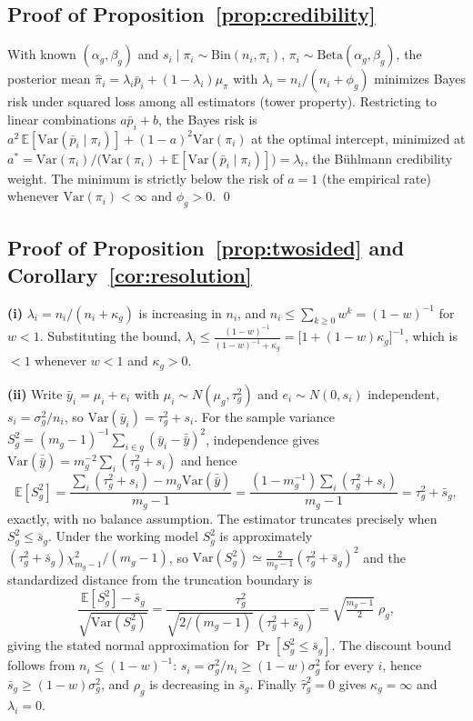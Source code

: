 \documentclass[twocolumn,10pt]{article}
\theoremstyle{definition}
\newcommand{\E}{\mathbb{E}}
\newcommand{\Var}{\mathrm{Var}}
\begin{document}
\subsection{Proof of Proposition~\ref{prop:credibility}}
With known $(\alpha_g,\beta_g)$ and $s_i\mid\pi_i\sim
\mathrm{Bin}(n_i,\pi_i)$, $\pi_i\sim\mathrm{Beta}(\alpha_g,\beta_g)$,
the posterior mean $\hat\pi_i=\lambda_i\bar p_i+(1-\lambda_i)\mu_\pi$
with $\lambda_i=n_i/(n_i+\phi_g)$ minimizes Bayes risk under squared
loss among all estimators (tower property). Restricting to linear
combinations $a\bar p_i+b$, the Bayes risk is
$a^2\,\E[\Var(\bar p_i\mid\pi_i)] + (1-a)^2\Var(\pi_i)$ at the optimal
intercept, minimized at
$a^{*}=\Var(\pi_i)/\bigl(\Var(\pi_i)+\E[\Var(\bar p_i\mid\pi_i)]\bigr)
=\lambda_i$, the B\"uhlmann credibility weight. The minimum is strictly
below the risk of $a=1$ (the empirical rate) whenever
$\Var(\pi_i)<\infty$ and $\phi_g>0$. \qed

\subsection{Proof of Proposition~\ref{prop:twosided} and
Corollary~\ref{cor:resolution}}

\textbf{(i)} $\lambda_i=n_i/(n_i+\kappa_g)$ is increasing in $n_i$, and
$n_i\le\sum_{k\ge0}w^{k}=(1-w)^{-1}$ for $w<1$. Substituting the bound,
$\lambda_i\le\frac{(1-w)^{-1}}{(1-w)^{-1}+\kappa_g}
=\bigl[1+(1-w)\kappa_g\bigr]^{-1}$, which is $<1$ whenever $w<1$ and
$\kappa_g>0$.

\textbf{(ii)} Write $\bar y_i=\mu_i+e_i$ with
$\mu_i\sim N(\mu_g,\tau_g^2)$ and $e_i\sim N(0,s_i)$ independent,
$s_i=\sigma_g^2/n_i$, so $\Var(\bar y_i)=\tau_g^2+s_i$. For the sample
variance $S_g^2=(m_g-1)^{-1}\sum_{i\in g}(\bar y_i-\bar{\bar y})^2$,
independence gives
$\Var(\bar{\bar y})=m_g^{-2}\sum_i(\tau_g^2+s_i)$ and hence
\[
\E[S_g^2]=\frac{\sum_i(\tau_g^2+s_i)-m_g\Var(\bar{\bar y})}{m_g-1}
=\frac{(1-m_g^{-1})\sum_i(\tau_g^2+s_i)}{m_g-1}
=\tau_g^2+\bar s_g ,
\]
exactly, with no balance assumption. The estimator truncates precisely
when $S_g^2\le\bar s_g$. Under the working model $S_g^2$ is
approximately $(\tau_g^2+\bar s_g)\chi^2_{m_g-1}/(m_g-1)$, so
$\Var(S_g^2)\simeq\frac{2}{m_g-1}(\tau_g^2+\bar s_g)^2$ and the
standardized distance from the truncation boundary is
\[
\frac{\E[S_g^2]-\bar s_g}{\sqrt{\Var(S_g^2)}}
=\frac{\tau_g^2}{\sqrt{2/(m_g-1)}\,(\tau_g^2+\bar s_g)}
=\sqrt{\tfrac{m_g-1}{2}}\;\rho_g ,
\]
giving the stated normal approximation for
$\Pr[S_g^2\le\bar s_g]$. The discount bound follows from
$n_i\le(1-w)^{-1}$: $s_i=\sigma_g^2/n_i\ge(1-w)\sigma_g^2$ for every
$i$, hence $\bar s_g\ge(1-w)\sigma_g^2$, and $\rho_g$ is decreasing in
$\bar s_g$. Finally $\hat\tau_g^2=0$ gives $\kappa_g=\infty$ and
$\lambda_i=0$.
\end{document}
